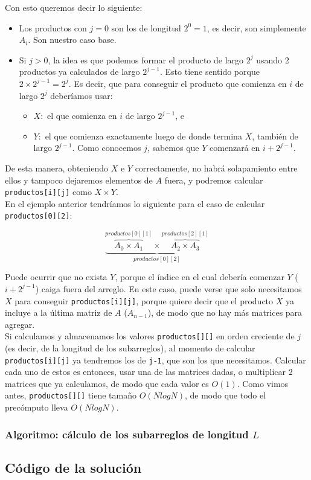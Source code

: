 Con esto queremos decir lo siguiente: 
\begin{itemize}
\item Los productos con $j=0$ son los de longitud $2^0=1$, es decir, 
son simplemente $A_i$. Son nuestro caso base. 
\item Si $j>0$, la idea es que podemos formar el producto de largo $2^j$ 
usando 2 productos ya calculados de largo $2^{j-1}$. Esto tiene sentido 
porque $2 \times 2^{j-1} = 2^j$. Es decir, que para conseguir el producto 
que comienza en $i$ de largo $2^j$ deberíamos usar: 
    \begin{itemize}
    \item $X:$ el que comienza en $i$ de largo $2^{j-1}$, e 
    \item $Y:$ el que comienza exactamente luego de donde termina $X$, también de largo 
    $2^{j-1}$. Como conocemos $j$, sabemos que $Y$ comenzará en $i+2^{j-1}$.
    \end{itemize}
\end{itemize}

De esta manera, obteniendo $X$ e $Y$ correctamente, no habrá solapamiento entre ellos 
y tampoco dejaremos elementos de $A$ fuera, y podremos calcular \texttt{productos[i][j]} 
como $X \times Y$. \\

En el ejemplo anterior tendríamos lo siguiente para el caso de calcular \texttt{productos[0][2]}:

$$\underset{productos[0][2]}{\underbrace{\overset{productos[0][1]}{\overbrace{A_0 \times A_1}} \times \overset{productos[2][1]}{\overbrace{A_2 \times A_3}}}}$$

Puede ocurrir que no exista $Y$, porque el índice en el cual debería comenzar $Y$ 
($i+2^{j-1}$) caiga fuera del arreglo. En este caso, puede verse que 
solo necesitamos $X$ para conseguir \texttt{productos[i][j]}, porque quiere decir que 
el producto $X$ ya incluye a la última matriz de $A$ ($A_{n-1}$), 
de modo que no hay más matrices para agregar. \\

Si calculamos y almacenamos los valores \texttt{productos[][]} en orden 
creciente de $j$ (es decir, de la longitud de los subarreglos), 
al momento de calcular \texttt{productos[i][j]} 
ya tendremos los de \texttt{j-1}, que son los que necesitamos. Calcular cada uno de estos es entonces, 
usar una de las matrices dadas, o multiplicar 2 matrices que ya calculamos, de modo que 
cada valor es $O(1)$. Como vimos antes, \texttt{productos[][]} tiene tamaño $O(N log N)$, 
de modo que todo el precómputo lleva $O(N log N)$. 

\subsubsection{Algoritmo: cálculo de los subarreglos de longitud $L$}

\newpage
\subsection{Código de la solución}

